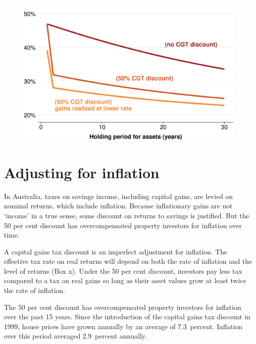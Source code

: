 \documentclass{grattan}\usepackage[]{graphicx}\usepackage[]{color}
\begin{document}
\begin{figure}
\includegraphics[width=\columnwidth]{CGT-NG-atlas//delaying-realization-causes-reduction-in-effective-tax-rate-1}
\end{figure}

\section{Adjusting for inflation}
In Australia, taxes on savings income, including capital gains, are levied on nominal returns, which include inflation. Because inflationary gains are not `income' in a true sense,  some discount on returns to savings is justified. But the 50 per cent discount has overcompensated property investors for inflation over time. 

A capital gains tax discount is an imperfect adjustment for inflation. The effective tax rate on real returns will depend on both the rate of inflation and the level of returns (Box x).  Under the 50 per cent discount, investors pay less tax compared to a tax on real gains so long as their asset values grow at least twice the rate of inflation. 






The 50 per cent discount has overcompensated property investors for inflation over the past 15 years. Since the introduction of the capital gains tax discount in 1999, house prices have grown annually by an average of 7.3~percent.  Inflation over this period averaged 2.9~percent annually. 
\end{document}
